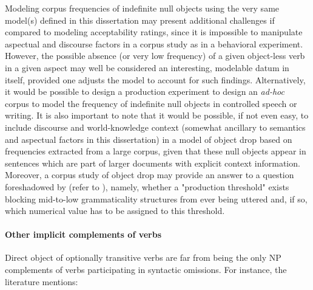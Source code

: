 Modeling corpus frequencies of indefinite null objects using the very same model(s) defined in this dissertation may present additional challenges if compared to modeling acceptability ratings, since it is impossible to manipulate aspectual and discourse factors in a corpus study as in a behavioral experiment. However, the possible absence (or very low frequency) of a given object-less verb in a given aspect may well be considered an interesting, modelable datum in itself, provided one adjusts the model to account for such findings. Alternatively, it would be possible to design a production experiment to design an \textit{ad-hoc} corpus to model the frequency of indefinite null objects in controlled speech or writing. It is also important to note that it would be possible, if not even easy, to include discourse and world-knowledge context (somewhat ancillary to semantics and aspectual factors in this dissertation) in a model of object drop based on frequencies extracted from a large corpus, given that these null objects appear in sentences which are part of larger documents with explicit context information. Moreover, a corpus study of object drop may provide an answer to a question foreshadowed by \textcite{KempenHarbusch2005, Medina2007} (refer to ), namely, whether a "production threshold" exists blocking mid-to-low grammaticality structures from ever being uttered and, if so, which numerical value has to be assigned to this threshold.



\paragraph{Other implicit complements of verbs}
Direct object of optionally transitive verbs are far from being the only NP complements of verbs participating in syntactic omissions. For instance, the literature mentions:

